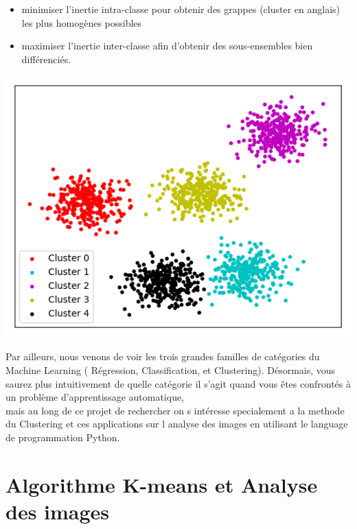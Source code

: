 \documentclass[a4paper,12pt]{report}
\begin{document}
\begin{itemize}
    \item minimiser l'inertie intra-classe pour obtenir des grappes (cluster en anglais) les plus homogènes possibles
    \item maximiser l'inertie inter-classe afin d'obtenir des sous-ensembles bien différenciés.\\
\end{itemize}

\includegraphics[width=1\textwidth]{clustering.png}



Par ailleurs, nous venons de voir les trois grandes familles de catégories du Machine Learning ( Régression, Classification, et Clustering). Désormais, vous saurez plus intuitivement de quelle catégorie il s’agit quand vous êtes confrontés à un problème d’apprentissage automatique, \\mais au long de ce projet de rechercher on s intéresse specialement a la methode du Clustering et ces applications sur l analyse des images en utilisant le language de programmation Python.











\chapter{Algorithme K-means et Analyse des images}
\end{document}
